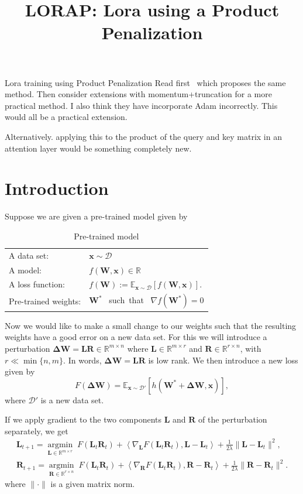 \documentclass[11pt]{article}
\date{}
\title{LORAP: Lora using a Product Penalization}
\author{} %
\newcommand{\bx}{\mathbf{x}}
\newcommand{\mat}[1]{\bm{#1}}
\newcommand{\R}{\mathbb{R}}
\newcommand{\cD}{\mathcal{D}}
\newcommand{\mL}{\mat{L}}
\newcommand{\mR}{\mat{R}}
\newcommand{\mW}{\mat{W}}
\newcommand{\DW}{\mat{\Delta W}}
\newcommand{\dotprod}[1]{\left< #1\right>}
\DeclareMathOperator{\argmininn}{argmin}
\newcommand{\argmin}[1]{ \underset{#1}{\argmininn} \;}
\newcommand{\EE}[2]{\mathbb{E}_{#1}\left[#2\right] }
\begin{document}
\maketitle


\tableofcontents

Lora training using Product Penalization
Read first~\cite{zhang2024riemannianpreconditionedlorafinetuning} which proposes the same method. Then consider extensions with momentum+truncation for a more practical method. I also think they have incorporate Adam incorrectly. This would all be a practical extension.

Alternatively. applying this to the product of the query and key matrix in an attention layer would be something completely new. 
\section{Introduction}


Suppose we are given a pre-trained model given by
\begin{table}[h!]
\centering
\begin{tabular}{ll}
    A data set: & $\bx \sim \cD$ \\
    A model: & $f(\mW, \bx) \in \R$ \\
    A loss function: & $f(\mW) := \EE{\bx \sim \cD}{f(\mW, \bx)}$. \\
   Pre-trained weights: & $\mW^*$ \mbox{ such that } $\nabla f(\mW^*) =0$
\end{tabular} 
\caption{Pre-trained model}
\end{table}

Now we would like to make a small change to our weights such that the resulting weights have a good error on a new data set. For this we will introduce a perturbation $\DW = \mL \mR \in \R^{m \times n}$ where $\mL\in \R^{m \times r}$ and $\mR \in \R^{r \times n}$, with $r \ll \min\{n,m\}$. In words, $\DW =\mL \mR$ is low rank. We then introduce a new loss given by
\begin{equation}
    F( \DW) = \EE{\bx \sim \cD'}{h(\mW^* + \DW, \bx)},
\end{equation}
where $\cD'$ is a new data set. 


If we apply  gradient to the two components $\mL$ and $\mR$ of the perturbation separately,  we get
\begin{align}
 \mL_{t+1}=   \argmin{\mL\in\R^{m \times r}} F(\mL_t\mR_t) + \dotprod{\nabla_{\mL} F(\mL_t\mR_t),\mL-\mL_t } + \frac{1}{2\lambda} \|\mL-\mL_t\|^2 , \label{eq:Luppartial}\\
  \mR_{t+1}=   \argmin{\mR \in \R^{r \times n}} F(\mL_t\mR_t) + \dotprod{\nabla_{\mR} F(\mL_t\mR_t), \mR-\mR_t } + \frac{1}{2\lambda} \|\mR-\mR_t\|^2.\label{eq:Ruppartial}
\end{align}
where  $\|\cdot\| $ is a given matrix norm. 
\end{document}
